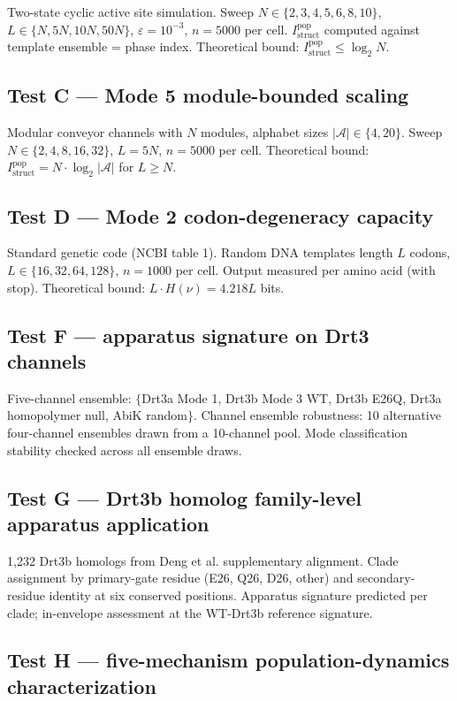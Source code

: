 \documentclass[aps,prx,reprint,amsmath,amssymb,floatfix,superscriptaddress,nofootinbib]{revtex4-2}
\theoremstyle{plain-thm}
\theoremstyle{definition-thm}
\newcommand{\Istructpop}{I_{\mathrm{struct}}^{\mathrm{pop}}}
\begin{document}
Two-state cyclic active site simulation. Sweep $N \in \{2, 3, 4, 5, 6, 8, 10\}$, $L \in \{N, 5N, 10N, 50N\}$, $\varepsilon = 10^{-3}$, $n = 5000$ per cell. $\Istructpop$ computed against template ensemble = phase index. Theoretical bound: $\Istructpop \le \log_2 N$.

\subsection{Test C --- Mode 5 module-bounded scaling}

Modular conveyor channels with $N$ modules, alphabet sizes $|\mathcal{A}| \in \{4, 20\}$. Sweep $N \in \{2, 4, 8, 16, 32\}$, $L = 5N$, $n = 5000$ per cell. Theoretical bound: $\Istructpop = N \cdot \log_2 |\mathcal{A}|$ for $L \ge N$.

\subsection{Test D --- Mode 2 codon-degeneracy capacity}

Standard genetic code (NCBI table 1). Random DNA templates length $L$ codons, $L \in \{16, 32, 64, 128\}$, $n = 1000$ per cell. Output measured per amino acid (with stop). Theoretical bound: $L \cdot H(\nu) = 4.218L$ bits.

\subsection{Test F --- apparatus signature on Drt3 channels}

Five-channel ensemble: $\{$Drt3a Mode 1, Drt3b Mode 3 WT, Drt3b E26Q, Drt3a homopolymer null, AbiK random$\}$. Channel ensemble robustness: 10 alternative four-channel ensembles drawn from a 10-channel pool. Mode classification stability checked across all ensemble draws.

\subsection{Test G --- Drt3b homolog family-level apparatus application}

1{,}232 Drt3b homologs from Deng et al. supplementary alignment. Clade assignment by primary-gate residue (E26, Q26, D26, other) and secondary-residue identity at six conserved positions. Apparatus signature predicted per clade; in-envelope assessment at the WT-Drt3b reference signature.

\subsection{Test H --- five-mechanism population-dynamics characterization}
\end{document}
